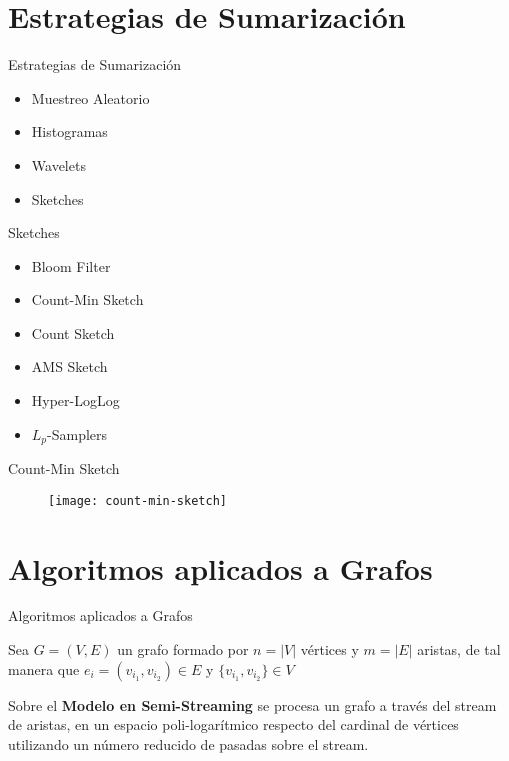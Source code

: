\documentclass[12pt]{beamer}
\begin{document}
  \section{Estrategias de Sumarización}

    \begin{frame}[fragile]{Estrategias de Sumarización}

      \begin{itemize}
        \item Muestreo Aleatorio
        \item Histogramas
        \item Wavelets
        \item Sketches
      \end{itemize}

    \end{frame}


    \begin{frame}[fragile]{Sketches}

      \begin{itemize}
        \item Bloom Filter \cite{bloom1970space}
        \item Count-Min Sketch \cite{cormode2005improved}
        \item Count Sketch \cite{charikar2002finding}
        \item AMS Sketch \cite{alon1996space}
        \item Hyper-LogLog \cite{flajolet2007hyperloglog}
        \item $L_p$-Samplers \cite{jowhari2011tight}
      \end{itemize}

    \end{frame}


    \begin{frame}[fragile]{Count-Min Sketch}

      \begin{figure}
        \texttt{[image: count-min-sketch]}
        \caption{}
      \end{figure}

    \end{frame}

  \section{Algoritmos aplicados a Grafos}

    \begin{frame}[fragile]{Algoritmos aplicados a Grafos}

      Sea $G=(V,E)$ un grafo formado por $n=|V|$ vértices y $m=|E|$ aristas, de tal manera que $e_i = (v_{i_1},v_{i_2}) \in E$ y $\{v_{i_1},v_{i_2}\} \in V$

      Sobre el \textbf{Modelo en Semi-Streaming} se procesa un grafo a través del stream de aristas, en un espacio poli-logarítmico respecto del cardinal de vértices utilizando un número reducido de pasadas sobre el stream.

    \end{frame}
\end{document}
